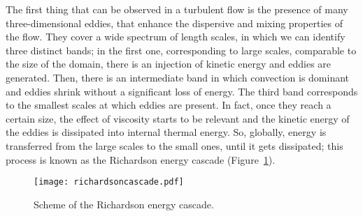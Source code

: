 The first thing that can be observed in a turbulent flow is the presence of 
many three-dimensional eddies, that enhance the dispersive and mixing 
properties of the flow. 
They cover a wide spectrum of length scales, in which we can identify 
three distinct bands; in the first one, corresponding to large scales, 
comparable to the size of the domain, there is an injection of kinetic energy 
and eddies are generated. Then, there is an intermediate band in which 
convection is dominant and eddies shrink without a significant loss of energy. 
The third band corresponds to the smallest scales at which eddies are present. 
In fact, once they reach a certain size, the effect of viscosity starts to 
be relevant and the kinetic energy of the eddies is dissipated
into internal thermal energy. So, globally, energy is transferred from the 
large 
scales to the small ones, until it gets dissipated; this process is known as 
the Richardson energy cascade (Figure~\ref{fig:cascade}).
\begin{figure}%
	\centering
	\texttt{[image: richardsoncascade.pdf]}
	\caption[Richardson energy cascade]{Scheme of the Richardson energy 
	cascade.}
	\label{fig:cascade}
\end{figure}
%

